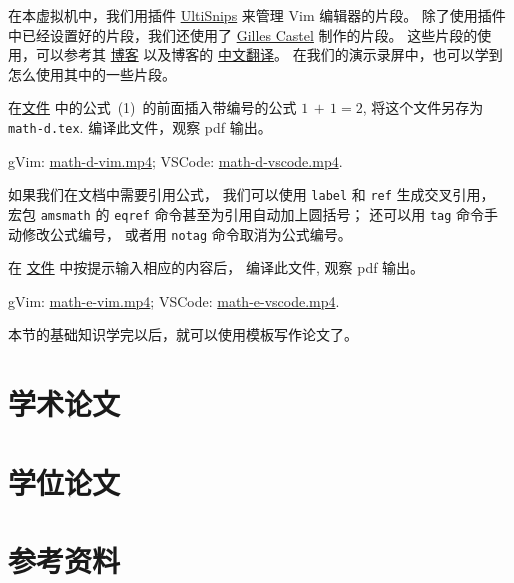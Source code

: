 \documentclass[
    11pt,
    base=hide,
    cite=authoryear,
    device=phone,
    lang=cn,
    mode=simple,
    result=answer,
    toc=onecol,
]{elegantbook_sierxue}
\begin{document}
在本虚拟机中，我们用插件
\href{https://github.com/SirVer/ultisnips}{UltiSnips}
来管理 Vim 编辑器的片段。
除了使用插件中已经设置好的片段，我们还使用了
\href{https://github.com/gillescastel/latex-snippets}{Gilles Castel}
制作的片段。
这些片段的使用，可以参考其
\href{https://castel.dev/post/lecture-notes-1/}{博客} 以及博客的
\href{https://bonxg.com/p/85.html}{中文翻译}。
在我们的演示录屏中，也可以学到怎么使用其中的一些片段。

\begin{exercise}\label{ex:math-d}
    在\href{learn-latex/basic-02/math-c.tex}{文件}
    中的公式~(1)~的前面插入带编号的公式 \(1\,+\,1 = 2\),
    将这个文件另存为 \texttt{math-d.tex}.
    编译此文件，观察 pdf 输出。
\end{exercise}
\begin{cast}\label{sol:math-d}
    gVim: \href{media/casts/math-d.mp4}{math-d-vim.mp4};
    VSCode: \href{media/casts/math-d.mp4}{math-d-vscode.mp4}.
\end{cast}

如果我们在文档中需要引用公式，
我们可以使用 \texttt{label} 和 \texttt{ref} 生成交叉引用，
宏包 \texttt{amsmath} 的 \texttt{eqref} 命令甚至为引用自动加上圆括号；
还可以用 \texttt{tag} 命令手动修改公式编号，
或者用 \texttt{notag} 命令取消为公式编号。

\begin{exercise}\label{ex:math-e}
    在 \href{learn-latex/basic-02/math-e.tex}{文件}
    中按提示输入相应的内容后，
    编译此文件, 观察 pdf 输出。
\end{exercise}
\begin{cast}\label{cast:math-e}
    gVim: \href{media/casts/math-e.mp4}{math-e-vim.mp4};
    VSCode: \href{media/casts/math-e.mp4}{math-e-vscode.mp4}.
\end{cast}
本节的基础知识学完以后，就可以使用模板写作论文了。

\newpage
\section{学术论文}%
\label{sec:latex-paper}

\newpage
\section{学位论文}%
\label{sec:latex-thesis}

\newpage
\section{参考资料}%
\label{sec:latex-refs}
\end{document}
